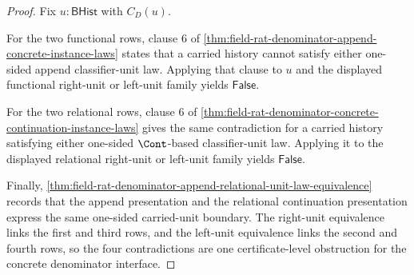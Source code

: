 \begin{proof}
Fix $u:\mathsf{BHist}$ with $C_D(u)$.

For the two functional rows, clause 6 of
\autoref{thm:field-rat-denominator-append-concrete-instance-laws} states that a
carried history cannot satisfy either one-sided append classifier-unit law.
Applying that clause to $u$ and the displayed functional right-unit or left-unit
family yields $\mathsf{False}$.

For the two relational rows, clause 6 of
\autoref{thm:field-rat-denominator-concrete-continuation-instance-laws} gives
the same contradiction for a carried history satisfying either one-sided
$\Cont$-based classifier-unit law. Applying it to the displayed relational
right-unit or left-unit family yields $\mathsf{False}$.

Finally,
\autoref{thm:field-rat-denominator-append-relational-unit-law-equivalence}
records that the append presentation and the relational continuation
presentation express the same one-sided carried-unit boundary. The right-unit
equivalence links the first and third rows, and the left-unit equivalence links
the second and fourth rows, so the four contradictions are one certificate-level
obstruction for the concrete denominator interface.
\end{proof}
